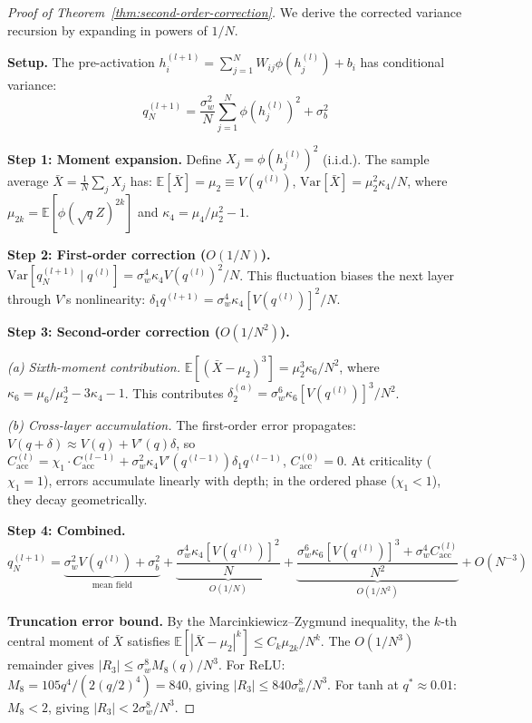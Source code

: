 \documentclass[10pt]{article}
\newcommand{\EE}{\mathbb{E}}
\newcommand{\Var}{\mathrm{Var}}
\begin{document}
\begin{proof}[Proof of Theorem~\ref{thm:second-order-correction}]
We derive the corrected variance recursion by expanding in powers of $1/N$.

\textbf{Setup.}
The pre-activation $h_i^{(l+1)} = \sum_{j=1}^N W_{ij} \phi(h_j^{(l)}) + b_i$ has conditional variance:
\begin{equation}
    q_N^{(l+1)} = \frac{\sigma_w^2}{N} \sum_{j=1}^N \phi(h_j^{(l)})^2 + \sigma_b^2
    \label{eq:cond-var}
\end{equation}

\textbf{Step 1: Moment expansion.}
Define $X_j = \phi(h_j^{(l)})^2$ (i.i.d.).  The sample average $\bar{X} = \frac{1}{N}\sum_j X_j$ has:
$\EE[\bar{X}] = \mu_2 \equiv V(q^{(l)})$, $\Var[\bar{X}] = \mu_2^2 \kappa_4 / N$,
where $\mu_{2k} = \EE[\phi(\sqrt{q}Z)^{2k}]$ and $\kappa_4 = \mu_4/\mu_2^2 - 1$.

\textbf{Step 2: First-order correction ($O(1/N)$).}
$\Var[q_N^{(l+1)} \mid q^{(l)}] = \sigma_w^4 \kappa_4 V(q^{(l)})^2/N$.
This fluctuation biases the next layer through $V$'s nonlinearity:
$\delta_1 q^{(l+1)} = \sigma_w^4 \kappa_4 [V(q^{(l)})]^2/N$.

\textbf{Step 3: Second-order correction ($O(1/N^2)$).}

\emph{(a) Sixth-moment contribution.}
$\EE[(\bar{X} - \mu_2)^3] = \mu_2^3 \kappa_6 / N^2$, where $\kappa_6 = \mu_6/\mu_2^3 - 3\kappa_4 - 1$.
This contributes $\delta_2^{(a)} = \sigma_w^6 \kappa_6 [V(q^{(l)})]^3 / N^2$.

\emph{(b) Cross-layer accumulation.}
The first-order error propagates: $V(q + \delta) \approx V(q) + V'(q)\delta$, so
$C_{\mathrm{acc}}^{(l)} = \chi_1 \cdot C_{\mathrm{acc}}^{(l-1)} + \sigma_w^2 \kappa_4 V'(q^{(l-1)}) \delta_1 q^{(l-1)}$, $C_{\mathrm{acc}}^{(0)} = 0$.
At criticality ($\chi_1 = 1$), errors accumulate linearly with depth; in the ordered phase ($\chi_1 < 1$), they decay geometrically.

\textbf{Step 4: Combined.}
\begin{equation}
    q_N^{(l+1)} = \underbrace{\sigma_w^2 V(q^{(l)}) + \sigma_b^2}_{\text{mean field}} + \underbrace{\frac{\sigma_w^4 \kappa_4 [V(q^{(l)})]^2}{N}}_{O(1/N)} + \underbrace{\frac{\sigma_w^6 \kappa_6 [V(q^{(l)})]^3 + \sigma_w^4 C_{\mathrm{acc}}^{(l)}}{N^2}}_{O(1/N^2)} + O(N^{-3})
\end{equation}

\textbf{Truncation error bound.}
By the Marcinkiewicz--Zygmund inequality, the $k$-th central moment of $\bar{X}$ satisfies $\EE[|\bar{X}-\mu_2|^k] \leq C_k \mu_{2k}/N^k$.
The $O(1/N^3)$ remainder gives $|R_3| \leq \sigma_w^8 M_8(q)/N^3$.
For ReLU: $M_8 = 105 q^4/(2(q/2)^4) = 840$, giving $|R_3| \leq 840\sigma_w^8/N^3$.
For tanh at $q^* \approx 0.01$: $M_8 < 2$, giving $|R_3| < 2\sigma_w^8/N^3$.
\end{proof}
\end{document}
